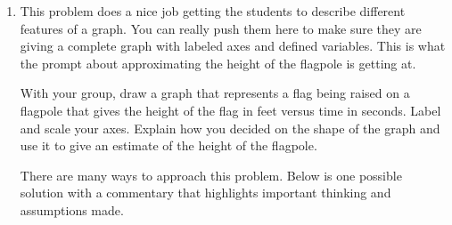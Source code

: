 \documentclass[10pt]{article}
\begin{document}
\begin{enumerate}[leftmargin=*]
\begin{enumerate}
\begin{solution}
\begin{center}
 \end{center}

   Sometimes it is much easier to work with a specific solution and try and generalize. 
        \end{solution} 
    \end{enumerate}

\item
    \begin{note}
        This problem does a nice job getting the students to describe different features of a graph. You can really push them here to make sure they are giving a complete graph with labeled axes and defined variables. This is what the prompt about approximating the height of the flagpole is getting at.
    \end{note}

    \begin{problem}[\vfill]
        With your group, draw a  graph that represents a flag being raised on a flagpole that gives the height of the flag in feet versus time in seconds. Label and scale your axes. Explain how you decided on the shape of the graph and use it to give an estimate of the height of the flagpole.
    \end{problem}
    \begin{solution} 
There are many ways to approach this problem. Below is one possible solution with a commentary that highlights important thinking and assumptions made. 

\end{solution}
\end{enumerate}
\end{document}
